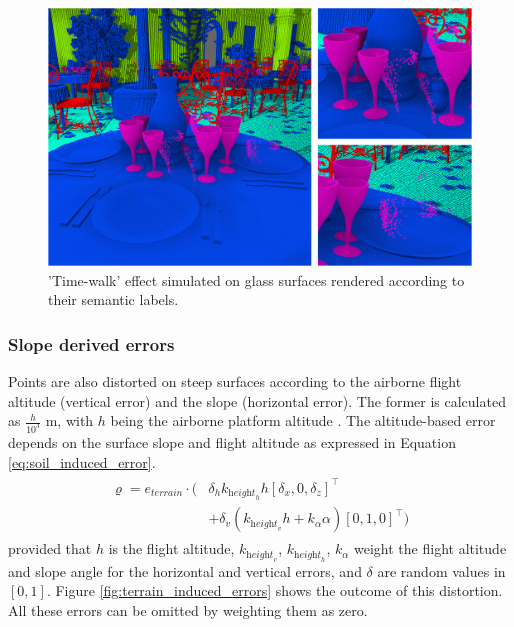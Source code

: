 \begin{figure}[ht]
	\centering
	\includegraphics[width=\linewidth]{figs/lidar_simulation/glossy_time_walk.png}
	\caption{'Time-walk' effect simulated on glass surfaces rendered according to their semantic labels. }
	\label{fig:shiny_surface_error}
\end{figure}

\subsubsection{Slope derived errors}

Points are also distorted on steep surfaces according to the airborne flight altitude (vertical error) and the slope (horizontal error). The former is calculated as $\frac{h}{10^3}$ \si{\meter}, with $h$ being the airborne platform altitude \cite{hodgson_accuracy_2004}. The altitude-based error depends on the surface slope and flight altitude \cite{baltsavias_comparison_1999} as expressed in Equation \ref{eq:soil_induced_error}.
\begin{gather}
    \label{eq:soil_induced_error}
    \begin{aligned}
        \varrho = e_{\textit{terrain}} \cdot (&\delta_{h} k_{\textit{height}_{h}} h 
        \left[\delta_{x}, 0, \delta_{z}\right]^\intercal\\
        &+ \delta_{v} (k_{\textit{height}_{v}} h + k_{\alpha} \alpha)
        \left[0, 1, 0\right]^\intercal)
    \end{aligned}
\end{gather}
provided that $h$ is the flight altitude, $k_{\textit{height}_{v}}$, $k_{\textit{height}_{h}}$,  $k_{\alpha}$ weight the flight altitude and slope angle for the horizontal and vertical errors, and $\delta$ are random values in $[0, 1]$. Figure \ref{fig:terrain_induced_errors} shows the outcome of this distortion. All these errors can be omitted by weighting them as zero.


